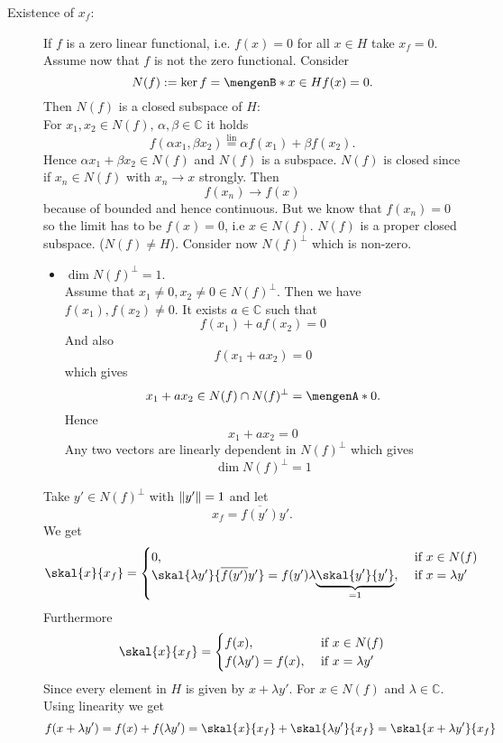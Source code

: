 \begin{beweis}
	\begin{description}
		\item[Existence of $x_f$:] If $f$ is a zero linear functional, i.e. $f(x)= 0$ for all $x \in H$ take $x_f = 0$. Assume now that $f$ is not the zero functional. Consider \[
			N(f) := \ker{f} = \set[x \in H]{f(x)= 0}.
		\] 
		Then $N(f)$ is a closed subspace of $H$: \\
		For $x_1,x_2 \in N(f), \,\alpha, \beta \in \mathbb{C}$ it holds
		\[
			f( \alpha x_1, \beta x_2) \stackrel{\text{lin}}{=} \alpha f(x_1) + \beta f(x_2).
		\]
		Hence $\alpha x_1 + \beta x_2 \in N(f)$ and $N(f)$ is a subspace. $N(f)$ is closed since if $x_n \in N(f)$ with $x_n \to x$ strongly. Then 
		\[
			f(x_n) \to f(x)
		\] 
		because of bounded and hence continuous. But we know that $f(x_n) = 0$ so the limit has to be $f(x)=0$, i.e $x \in N(f)$. $N(f)$ is a proper closed subspace. ($N(f) \neq H$). Consider now $N(f)^{\perp}$ which is non-zero. \begin{itemize}
			\item $\dim N(f)^{\perp} = 1$. \\
			Assume that $x_1 \neq 0,x_2 \neq 0 \in N(f)^{\perp}$. Then we have $f(x_1),f(x_2) \neq 0$. It exists $a \in \mathbb{C}$ such that
			\[
				f(x_1) + a f(x_2) = 0
			\]
			And also
			\[
				f(x_1+a x_2) = 0
			\]
			which gives 
			\[
				x_1+a x_2 \in N(f) \cap N(f)^{\perp} = \set{0}.
 			\] 
			Hence
			\[
				x_1 + a x_2 = 0
			\]
			Any two vectors are linearly dependent in $N(f)^{\perp}$ which gives \[
				\dim N(f)^{\perp} = 1
			\]
		\end{itemize}
		Take $y' \in N(f)^{\perp}$ with $\norm{y'} = 1$ and let \[
			x_f = \overline{f(y')}y'.
		\]
		We get
		\[
			\skal{x}{x_f} = \begin{cases}
				0, &\text{ if }x \in N(f)\\
				\skal{\lambda y'}{\overline{f(y')}y'}= f(y') \lambda \underset{=1}{\underbrace{\skal{y'}{y'}}}, &\text{ if }x = \lambda y'
			\end{cases}
		\]
		Furthermore
		\[
			\skal{x}{x_f} = \begin{cases}
				f(x), &\text{ if }x \in N(f)\\
				f(\lambda y') = f(x), &\text{ if }x = \lambda y'
			\end{cases}
		\]
		Since every element in $H$ is given by $x + \lambda y'$. For $x \in N(f)$ and $\lambda \in \mathbb{C}$. Using linearity we get \[
			f(x + \lambda y') = f(x) + f(\lambda y') = \skal{x}{x_f} + \skal{\lambda y'}{x_f} = \skal{x+ \lambda y'}{x_f}
\]
\end{description}
\end{beweis}
